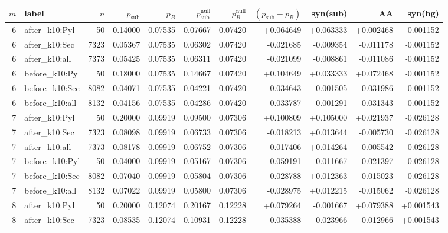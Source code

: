 \begingroup
{}
\scriptsize
\setlength{\tabcolsep}{4pt}
\renewcommand{\arraystretch}{1.10}
\setlength{\LTleft}{0pt}
\setlength{\LTright}{0pt}
\begin{longtable}{r l r r r r r r r r r}
\toprule
$m$ & label & $n$ & $p_{\mathrm{sub}}$ & $p_B$ & $p^{\mathrm{null}}_{\mathrm{sub}}$ & $p^{\mathrm{null}}_B$ & $(p_{\mathrm{sub}}-p_B)$ & syn(sub) & AA & syn(bg) \\
\midrule
6 & after\_k10:Pyl & 50 & 0.14000 & 0.07535 & 0.07667 & 0.07420 & +0.064649 & +0.063333 & +0.002468 & -0.001152 \\
6 & after\_k10:Sec & 7323 & 0.05367 & 0.07535 & 0.06302 & 0.07420 & -0.021685 & -0.009354 & -0.011178 & -0.001152 \\
6 & after\_k10:all & 7373 & 0.05425 & 0.07535 & 0.06311 & 0.07420 & -0.021099 & -0.008861 & -0.011086 & -0.001152 \\
6 & before\_k10:Pyl & 50 & 0.18000 & 0.07535 & 0.14667 & 0.07420 & +0.104649 & +0.033333 & +0.072468 & -0.001152 \\
6 & before\_k10:Sec & 8082 & 0.04071 & 0.07535 & 0.04221 & 0.07420 & -0.034643 & -0.001505 & -0.031986 & -0.001152 \\
6 & before\_k10:all & 8132 & 0.04156 & 0.07535 & 0.04286 & 0.07420 & -0.033787 & -0.001291 & -0.031343 & -0.001152 \\
7 & after\_k10:Pyl & 50 & 0.20000 & 0.09919 & 0.09500 & 0.07306 & +0.100809 & +0.105000 & +0.021937 & -0.026128 \\
7 & after\_k10:Sec & 7323 & 0.08098 & 0.09919 & 0.06733 & 0.07306 & -0.018213 & +0.013644 & -0.005730 & -0.026128 \\
7 & after\_k10:all & 7373 & 0.08178 & 0.09919 & 0.06752 & 0.07306 & -0.017406 & +0.014264 & -0.005542 & -0.026128 \\
7 & before\_k10:Pyl & 50 & 0.04000 & 0.09919 & 0.05167 & 0.07306 & -0.059191 & -0.011667 & -0.021397 & -0.026128 \\
7 & before\_k10:Sec & 8082 & 0.07040 & 0.09919 & 0.05804 & 0.07306 & -0.028788 & +0.012363 & -0.015023 & -0.026128 \\
7 & before\_k10:all & 8132 & 0.07022 & 0.09919 & 0.05800 & 0.07306 & -0.028975 & +0.012215 & -0.015062 & -0.026128 \\
8 & after\_k10:Pyl & 50 & 0.20000 & 0.12074 & 0.20167 & 0.12228 & +0.079264 & -0.001667 & +0.079388 & +0.001543 \\
8 & after\_k10:Sec & 7323 & 0.08535 & 0.12074 & 0.10931 & 0.12228 & -0.035388 & -0.023966 & -0.012966 & +0.001543 \\

\end{longtable}
